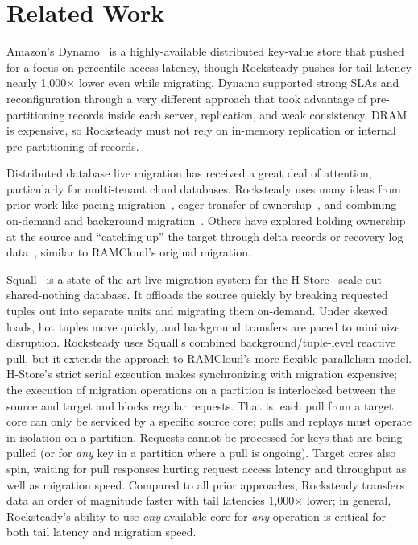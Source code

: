 \section{Related Work}

Amazon's Dynamo~\cite{dynamo} is a highly-available distributed key-value store
that pushed for a focus on \nnnth percentile access latency, though Rocksteady
pushes for tail latency nearly 1,000$\times$ lower even while migrating. Dynamo
supported strong SLAs and reconfiguration through a very different approach
that took advantage of pre-partitioning records inside each server, replication,
and weak consistency. DRAM is expensive, so Rocksteady must not rely on
in-memory replication or internal pre-partitioning of records.

Distributed database live migration has received a great deal of attention,
particularly for multi-tenant cloud databases. Rocksteady uses many ideas from
prior work like pacing migration~\cite{slacker}, eager transfer of
ownership~\cite{zephyr,squall}, and combining on-demand and background
migration~\cite{squall,zephyr,prorea}. Others have explored holding ownership
at the source and ``catching up'' the target through delta records or recovery
log data~\cite{albatross}, similar to RAMCloud's original migration.

Squall~\cite{squall,estore} is a state-of-the-art live migration system for the
H-Store~\cite{hstore} scale-out shared-nothing database. It offloads the source
quickly by breaking requested tuples out into separate units and migrating
them on-demand. Under skewed loads, hot tuples move quickly, and background
transfers are paced to minimize disruption. Rocksteady uses Squall's
combined background/tuple-level reactive pull, but it extends the approach to
RAMCloud's more flexible parallelism model.
H-Store's strict serial execution makes synchronizing with migration expensive;
the execution of migration operations on a partition
is interlocked between the source and target and blocks regular
requests.  That is, each pull from a target core can only be serviced by a
specific source core; pulls and replays must operate in
isolation on a partition. Requests cannot be processed for keys that are
being pulled (or for {\em any} key in a partition where a pull is ongoing).
Target cores also spin, waiting for pull responses hurting
request access latency and throughput as well as migration speed.
Compared to all prior approaches, Rocksteady transfers data an order of
magnitude faster with tail latencies 1,000$\times$ lower; in general,
Rocksteady's ability to use {\em any} available core for {\em any} operation is
critical for both tail latency and migration speed.

